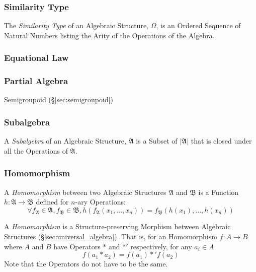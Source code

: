 \subsubsection{Similarity Type}\label{sec:similarity_type}

The \emph{Similarity Type} of an Algebraic Structure, $\Omega$, is an Ordered
Sequence of Natural Numbers listing the Arity of the Operations of the Algebra.



\subsubsection{Equational Law}\label{sec:equational_law}

\subsubsection{Partial Algebra}\label{sec:partial_algebra}

Semigroupoid (\S\ref{sec:semigroupoid})



\subsubsection{Subalgebra}\label{sec:subalgebra}

A \emph{Subalgebra} of an Algebraic Structure, $\mathfrak{A}$ is a Subset of
$|\mathfrak{A}|$ that is closed under all the Operations of $\mathfrak{A}$.



\subsubsection{Homomorphism}\label{sec:homomorphism}

A \emph{Homomorphism} between two Algebraic Structures $\mathfrak{A}$ and
$\mathfrak{B}$ is a Function $h: \mathfrak{A} \rightarrow \mathfrak{B}$ defined
for $n$-ary Operations:
\[
  \forall f_\mathfrak{A} \in \mathfrak{A}, f_\mathfrak{B} \in
  \mathfrak{B}, h(f_\mathfrak{A}(x_1, ..., x_n)) =
  f_\mathfrak{B}(h(x_1), ..., h(x_n))
\]


A \emph{Homomorphism} is a Structure-preserving Morphism between Algebraic
Structures (\S\ref{sec:universal_algebra}). That is, for an Homomorphism $f : A
\rightarrow B$ where $A$ and $B$ have Operators $*$ and $*'$ respectively, for
any $a_i \in A$
\[
  f(a_1 * a_2) = f(a_1) *' f(a_2)
\]
\fist Note that the Operators do not have to be the same.



